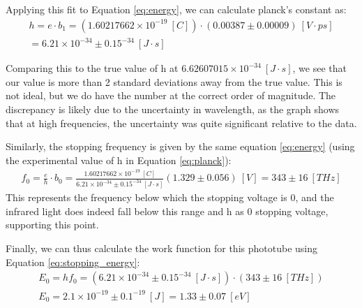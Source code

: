 Applying this fit to Equation \ref{eq:energy}, we can calculate planck's constant as:
\begin{gather}
    \label{eq:planck}
    h = e \cdot b_1 = (1.60217662 \times 10^{-19}~[C]) \cdot (0.00387 \pm 0.00009)~[V\cdot ps] \\
    = 6.21 \times 10^{-34} \pm 0.15^{-34} ~ [J\cdot s]
\end{gather}

Comparing this to the true value of h at $6.62607015 \times 10^{-34}~[J\cdot s]$, we see that our value is more than 2 standard deviations away from the true value. This is not ideal, but we do have the number at the correct order of magnitude. The discrepancy is likely due to the uncertainty in wavelength, as the graph shows that at high frequencies, the uncertainty was quite significant relative to the data.

Similarly, the stopping frequency is given by the same equation \ref{eq:energy} (using the experimental value of h in Equation \ref{eq:planck}):
\begin{gather*}
    f_0 = \frac{e}{h} \cdot b_0 = \frac{1.60217662 \times 10^{-19}~[C]}{6.21 \times 10^{-34} \pm 0.15^{-34} ~ [J\cdot s]}(1.329 \pm 0.056)~[V] = 343 \pm 16~[THz]
\end{gather*}
This represents the frequency below which the stopping voltage is 0, and the infrared light does indeed fall below this range and h as 0 stopping voltage, supporting this point.

Finally, we can thus calculate the work function for this phototube using Equation \ref{eq:stopping_energy}:
\begin{gather}
    E_0 = hf_0 = (6.21 \times 10^{-34} \pm 0.15^{-34} ~ [J\cdot s]) \cdot (343 \pm 16~[THz]) \\ 
    E_0= 2.1 \times 10^{-19} \pm 0.1^{-19} ~ [J] = 1.33 \pm 0.07 ~ [eV]
    \label{eq:work_function}
\end{gather}